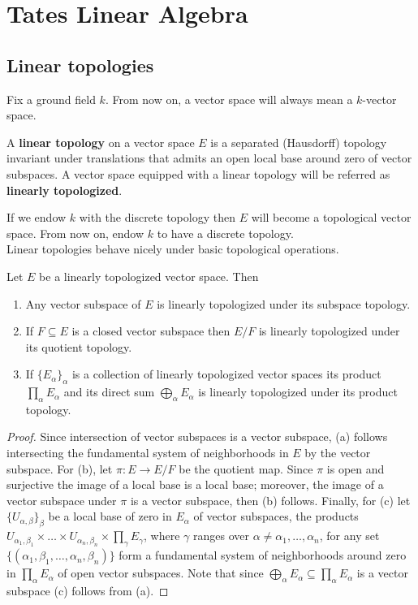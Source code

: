 \chapter{Tates Linear Algebra}\label{ch:tate-linear-algebra}
\section{Linear topologies}
Fix a ground field $k$. From now on, a vector space will always mean a $k$-vector space.
\begin{definition}\label{linear_topology}
A \textbf{linear topology} on a vector space $E$ is a separated (Hausdorff) topology invariant under translations that admits an open local base around zero of vector subspaces. A vector space equipped with a linear topology will be referred as \textbf{linearly topologized}.
\end{definition}
If we endow $k$ with the discrete topology then $E$ will become a topological vector space. From now on, endow $k$ to have a discrete topology. \\
Linear topologies behave nicely under basic topological operations.
\begin{proposition}\label{linear_topologies_properties}
Let $E$ be a linearly topologized vector space. Then
	\begin{enumerate}[label = (\alph*)]
		\item Any vector subspace of $E$ is linearly topologized under its subspace topology.
		\item If $F \subseteq E$ is a closed vector subspace then $E/F$ is linearly topologized under its quotient topology.
		\item If $\{E_{\alpha}\}_{\alpha}$ is a collection of linearly topologized vector spaces its product $\prod_{\alpha} E_{\alpha}$ and its direct sum $\bigoplus_{\alpha} E_{\alpha}$ is linearly topologized under its product topology.
	\end{enumerate}
\end{proposition}
\begin{proof}
	Since intersection of vector subspaces is a vector subspace, (a) follows intersecting the fundamental system of neighborhoods in $E$ by the vector subspace. For (b), let $\pi\colon E \to E/F$ be the quotient map. Since $\pi$ is open and surjective the image of a local base is a local base; moreover, the image of a vector subspace under $\pi$ is a vector subspace, then (b) follows. Finally, for (c) let $\{U_{\alpha, \beta}\}_{\beta}$ be a local base of zero in $E_{\alpha}$ of vector subspaces, the products $U_{\alpha_{1}, \beta_{1}} \times \ldots \times U_{\alpha_{n}, \beta_{n}} \times \prod_{\gamma} E_{\gamma}$, where $\gamma$ ranges over $\alpha \neq \alpha_{1}, \ldots, \alpha_{n}$, for any set $\{(\alpha_{1}, \beta_{1}, \ldots, \alpha_{n}, \beta_{n})\}$ form a fundamental system of neighborhoods around zero in $\prod_{\alpha} E_{\alpha}$ of open vector subspaces. Note that since $\bigoplus_{\alpha} E_{\alpha} \subseteq \prod_{\alpha} E_{\alpha}$ is a vector subspace (c) follows from (a). 
\end{proof}
